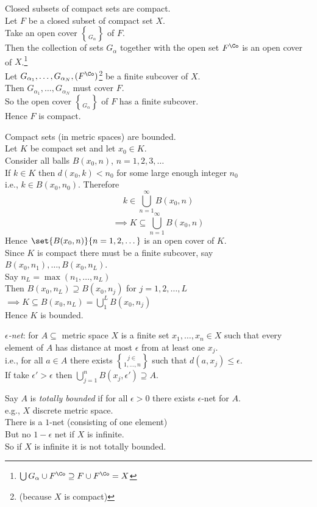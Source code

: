 \prop Closed subsets of compact sets are compact. \\
\pf Let $F$ be a closed subset of compact set $X$. \\
Take an open cover $\brace{G_\alpha}$ of $F$. \\
Then the collection of sets $G_\alpha$ together with the open set $F^\Co$ is an open cover of $X$.\footnote{$\bigcup G_\alpha\cup F^\Co\supseteq F\cup F^\Co=X$} \\
Let $G_{\alpha_1},\dotsc,G_{\alpha_N},(F^\Co)$\footnote{(because $X$ is compact)} be a finite subcover of $X$. \\
Then $G_{\alpha_1},\dotsc,G_{\alpha_N}$ must cover $F$. \\
So the open cover $\brace{G_\alpha}$ of $F$ has a finite subcover. \\
Hence $F$ is compact.

\prop Compact sets (in metric spaces) are bounded. \\
\pf Let $K$ be compact set and let $x_0\in K$. \\
Consider all balls $B(x_0,n)$, $n=1,2,3,\dotsc$ \\
If $k\in K$ then $d(x_0,k)<n_0$ for some large enough integer $n_0$ \\
i.e., $k\in B(x_0,n_0)$.  Therefore
\[ k \in \bigcup_{n=1}^\infty B(x_0,n) \]
\[ \implies K \subseteq \bigcup_{n=1}^\infty B(x_0,n) \]
Hence $\set{B(x_0,n)}{n=1,2,\dotsc}$ is an open cover of $K$. \\
Since $K$ is compact there must be a finite subcover, say $B(x_0,n_1),\dotsc,B(x_0,n_L)$. \\
Say $n_L=\max(n_1,\dotsc,n_L)$ \\
Then $B(x_0,n_L)\supseteq B(x_0,n_j)$ for $j=1,2,\dotsc,L$ \\
$\implies K \subseteq B(x_0,n_L) = \bigcup_1^L B(x_0,n_j)$ \\
Hence $K$ is bounded.

 \emph{$\epsilon$-net}: for $A\subseteq$ metric space $X$ is a finite set $x_1,\dotsc,x_n\in X$ such that every element of $A$ has distance at most $\epsilon$ from at least one $x_j$. \\
i.e., for all $a\in A$ there exists $j\in\brace{1,\dotsc,n}$ such that $d(a,x_j)\leq\epsilon$. \\
If take $\epsilon'>\epsilon$ then $\bigcup_{j=1}^n B(x_j,\epsilon')\supseteq A$.

 Say $A$ is \emph{totally bounded} if for all $\epsilon>0$ there exists $\epsilon$-net for $A$. \\
e.g., $X$ discrete metric space. \\
There is a $1$-net (consisting of one element) \\
But no $1-\epsilon$ net if $X$ is infinite. \\
So if $X$ is infinite it is not totally bounded.

